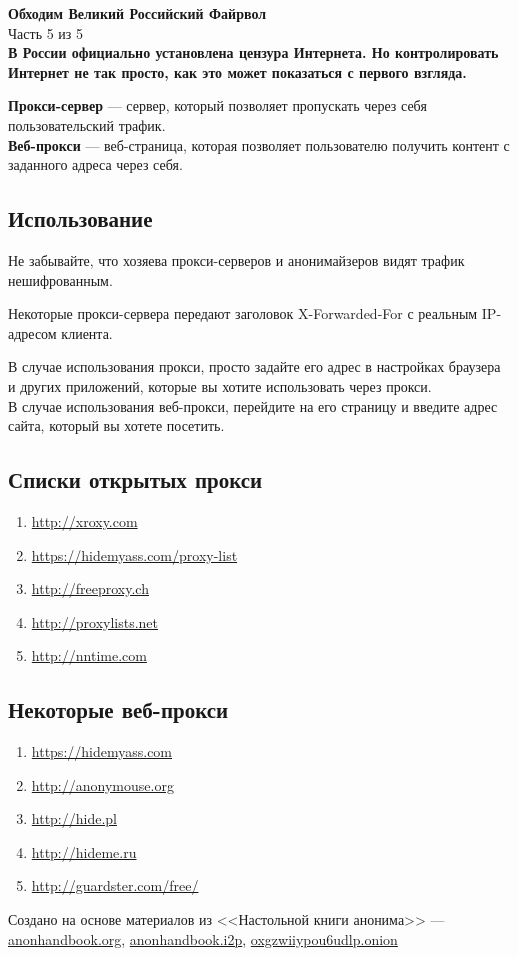 \begin{center}
\LARGE \textbf{Обходим Великий Российский Файрвол}\\
\large Часть 5 из 5\\
\normalsize\textbf{В России официально установлена цензура Интернета. Но контролировать Интернет не так просто, как это может показаться с первого взгляда.}
\end{center}
\textbf{Прокси-сервер} --- сервер, который позволяет пропускать через себя пользовательский трафик.\\
\textbf{Веб-прокси} --- веб-страница, которая позволяет пользователю получить контент с заданного адреса через себя.
\subsection*{Использование}
\begin{important}
Не забывайте, что хозяева прокси-серверов и анонимайзеров видят трафик нешифрованным.
\end{important}
\begin{important}
Некоторые прокси-сервера передают заголовок X-Forwarded-For с реальным IP-адресом клиента.
\end{important}
В случае использования прокси, просто задайте его адрес в настройках браузера и других приложений, которые вы хотите использовать через прокси.\\
В случае использования веб-прокси, перейдите на его страницу и введите адрес сайта, который вы хотете посетить.
\subsection*{Списки открытых прокси}
\begin{enumerate}
\item \url{http://xroxy.com}
\item \url{https://hidemyass.com/proxy-list}
\item \url{http://freeproxy.ch}
\item \url{http://proxylists.net}
\item \url{http://nntime.com}
\end{enumerate}
\subsection*{Некоторые веб-прокси}
\begin{enumerate}
\item \url{https://hidemyass.com}
\item \url{http://anonymouse.org}
\item \url{http://hide.pl}
\item \url{http://hideme.ru}
\item \url{http://guardster.com/free/}
\end{enumerate}

\vfill
\scriptsize Создано на основе материалов из <<Настольной книги анонима>> --- \url{anonhandbook.org}, \url{anonhandbook.i2p}, \url{oxgzwiiypou6udlp.onion}
\normalsize
